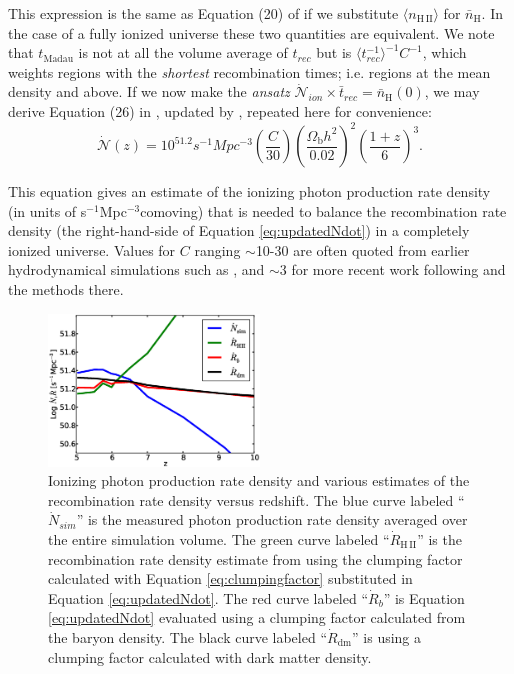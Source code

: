 This expression is the same as Equation (20) of \cite{MadauEtAl1999} if we substitute $\langle n_\mathrm{H\,II} \rangle$ for $\bar{n}_\mathrm{H}$. In the case of a fully ionized universe these two quantities are equivalent. We note that $t_\mathrm{Madau}$ is not at all the volume average of $t_{rec}$ but is $\langle t_{rec}^{-1} \rangle ^{-1}C^{-1}$, which weights regions
with the {\em shortest} recombination times; i.e. regions at the mean density and above. If we now make the 
{\em ansatz} $\dot{\mathcal{N}}_{ion} \times \bar{t}_{rec} = \bar{n}_\mathrm{H}(0)$, we may derive Equation (26) in \cite{MadauEtAl1999}, updated by \cite{FanEtAl2006}, repeated here for convenience:
\begin{equation}
	\label{eq:updatedNdot}
	\dot{\mathcal{N}}(z)=10^{51.2}s^{-1}Mpc^{-3}\left(\frac{C}{30}\right)\left(\frac{\Omega_\mathrm{b} h^2}{0.02}\right)^{2}\left(\frac{1+z}{6}\right)^{3}.
\end{equation}

This equation gives an estimate of the ionizing photon production rate density (in units of s$^{-1}$Mpc$^{-3}$comoving) that is needed to balance the recombination rate density (the right-hand-side of Equation \eqref{eq:updatedNdot}) in a completely ionized universe.  Values for $C$ ranging $\sim$10-30 are often quoted from earlier hydrodynamical simulations such as \cite{GnedinOstriker1997}, and $\sim 3$ for more recent work following \cite{PawlikEtAl2009, RaicevicTheuns2011, ShullEtAl2012, FinlatorEtAl2012} and the methods there.
\begin{figure}
	\includegraphics[width=0.5\textwidth]{unthresholded.eps}
	\caption{Ionizing photon production rate density and various estimates of the recombination rate density versus redshift. The blue curve labeled ``$\dot{N}_{sim}$'' is the measured photon production rate density averaged over the entire simulation volume. The green curve labeled ``$\dot{R}_\mathrm{H\,II}$'' is the recombination rate density estimate from using the clumping factor calculated with Equation \eqref{eq:clumpingfactor} substituted in Equation \eqref{eq:updatedNdot}. The red curve labeled ``$\dot{R}_b$'' is Equation \eqref{eq:updatedNdot} evaluated using a clumping factor calculated from the baryon density. The black curve labeled ``$\dot{R}_\mathrm{dm}$'' is using a clumping factor calculated with dark matter density.}
	\label{unthresholded}
\end{figure}

